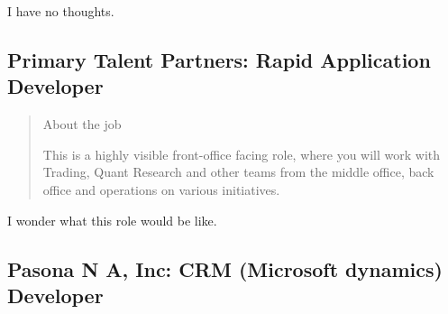 \documentclass[
	letterpaper, %
	12pt, %
]{CSSullivanBusinessReport}
\begin{document}
I have no thoughts. 


\subsection[Primary Talent Partners]{Primary Talent Partners: Rapid Application Developer}

\begin{quote}
	About the job
	
	This is a highly visible front-office facing role, where you will work with Trading, Quant Research and other teams from the middle office, back office and operations on various initiatives. 

\end{quote}

I wonder what this role would be like. 


\subsection[Pasona N A, Inc]{Pasona N A, Inc: CRM (Microsoft dynamics) Developer}
\end{document}
